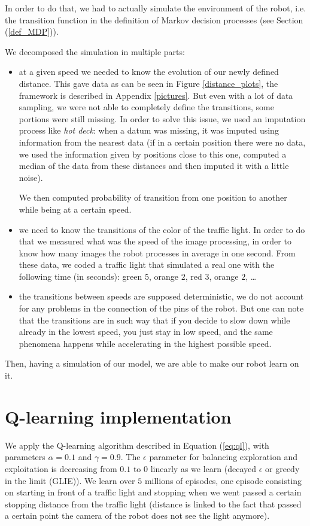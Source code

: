 \documentclass[14pt,a4paper]{article}
\theoremstyle{definition}
\begin{document}
In order to do that, we had to actually simulate the environment of the robot, i.e. the transition function in the definition of Markov decision processes (see Section (\ref{def_MDP})).


We decomposed the simulation in multiple parts: 
\begin{itemize}
\item at a given speed we needed to know the evolution of our newly defined distance. This gave data as can be seen in Figure \ref{distance_plots}, the framework is described in Appendix \ref{pictures}. But even with a lot of data sampling, we were not able to completely define the transitions, some portions were still missing. In order to solve this issue, we used an imputation process like \emph{hot deck}: when a datum was missing, it was imputed using information from the nearest data (if in a certain position there were no data, we used the information given by positions close to this one, computed a median of the data from these distances and then imputed it with a little noise).

 We then computed probability of transition from one position to another while being at a certain speed.
\item we need to know the transitions of the color of the traffic light. In order to do that we measured what was the speed of the image processing, in order to know how many images the robot processes in average in one second. From these data, we coded a traffic light that simulated a real one with the following time (in seconds): green $5$, orange $2$, red $3$, orange $2$, \ldots
\item the transitions between speeds are supposed deterministic, we do not account for any problems in the connection of the pins of the robot. But one can note that the transitions are in such way that if you decide to slow down while already in the lowest speed, you just stay in low speed, and the same phenomena happens while accelerating in the highest possible speed.
\end{itemize}

Then, having a simulation of our model, we are able to make our robot learn on it.



\section{Q-learning implementation}


We apply the Q-learning algorithm described in Equation (\ref{eq:ql}), with parameters $\alpha = 0.1$ and $\gamma = 0.9$. The $\epsilon$ parameter for balancing exploration and exploitation is decreasing from $0.1$ to $0$ linearly as we learn (decayed $\epsilon$ or greedy in the limit (GLIE)). We learn over $5$ millions of episodes, one episode consisting on starting in front of a traffic light and stopping when we went passed a certain stopping distance from the traffic light (distance is linked to the fact that passed a certain point the camera of the robot does not see the light anymore).
\end{document}
